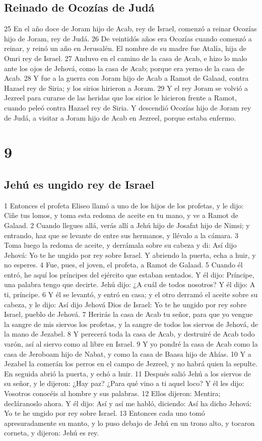 \section*{Reinado de Ocozías de Judá }

25 En el año doce de Joram hijo de Acab, rey de Israel, comenzó a reinar Ocozías hijo de Joram, rey de Judá. 
26 De veintidós años era Ocozías cuando comenzó a reinar, y reinó un año en Jerusalén. El nombre de su madre fue Atalía, hija de Omri rey de Israel.
27 Anduvo en el camino de la casa de Acab, e hizo lo malo ante los ojos de Jehová, como la casa de Acab; porque era yerno de la casa de Acab.
28 Y fue a la guerra con Joram hijo de Acab a Ramot de Galaad, contra Hazael rey de Siria; y los sirios hirieron a Joram.
29 Y el rey Joram se volvió a Jezreel para curarse de las heridas que los sirios le hicieron frente a Ramot, cuando peleó contra Hazael rey de Siria. Y descendió Ocozías hijo de Joram rey de Judá, a visitar a Joram hijo de Acab en Jezreel, porque estaba enfermo.

\chapter{9}

\section*{Jehú es ungido rey de Israel}


1 Entonces el profeta Eliseo llamó a uno de los hijos de los profetas, y le dijo: Ciñe tus lomos, y toma esta redoma de aceite en tu mano, y ve a Ramot de Galaad.
2 Cuando llegues allá, verás allí a Jehú hijo de Josafat hijo de Nimsi; y entrando, haz que se levante de entre sus hermanos, y llévalo a la cámara.
3 Toma luego la redoma de aceite, y derrámala sobre su cabeza y di: Así dijo Jehová: Yo te he ungido por rey sobre Israel. Y abriendo la puerta, echa a huir, y no esperes.
4 Fue, pues, el joven, el profeta, a Ramot de Galaad.
5 Cuando él entró, he aquí los príncipes del ejército que estaban sentados. Y él dijo: Príncipe, una palabra tengo que decirte. Jehú dijo: ¿A cuál de todos nosotros? Y él dijo: A ti, príncipe.
6 Y él se levantó, y entró en casa; y el otro derramó el aceite sobre su cabeza, y le dijo: Así dijo Jehová Dios de Israel: Yo te he ungido por rey sobre Israel, pueblo de Jehová. 
7 Herirás la casa de Acab tu señor, para que yo vengue la sangre de mis siervos los profetas, y la sangre de todos los siervos de Jehová, de la mano de Jezabel.
8 Y perecerá toda la casa de Acab, y destruiré de Acab todo varón, así al siervo como al libre en Israel.
9 Y yo pondré la casa de Acab como la casa de Jeroboam hijo de Nabat, y como la casa de Baasa hijo de Ahías.
10 Y a Jezabel la comerán los perros en el campo de Jezreel, y no habrá quien la sepulte. En seguida abrió la puerta, y echó a huir.
11 Después salió Jehú a los siervos de su señor, y le dijeron: ¿Hay paz? ¿Para qué vino a ti aquel loco? Y él les dijo: Vosotros conocéis al hombre y sus palabras.
12 Ellos dijeron: Mentira; decláranoslo ahora. Y él dijo: Así y así me habló, diciendo: Así ha dicho Jehová: Yo te he ungido por rey sobre Israel.
13 Entonces cada uno tomó apresuradamente su manto, y lo puso debajo de Jehú en un trono alto, y tocaron corneta, y dijeron: Jehú es rey.

